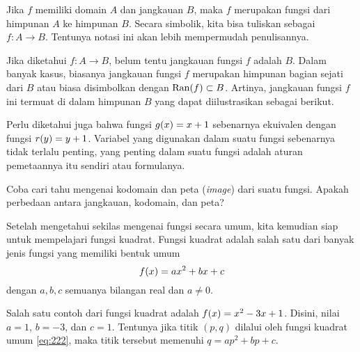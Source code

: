 \par Jika $ f $ memiliki domain $ A $ dan jangkauan $ B $, maka $ f $ merupakan fungsi dari himpunan $ A $ ke himpunan $ B $. Secara simbolik, kita bisa tuliskan sebagai $ f \colon A \to B $. Tentunya notasi ini akan lebih mempermudah penulisannya.

\begin{warningbox}
	Jika diketahui $ f \colon A \to B $, belum tentu jangkauan fungsi $ f $ adalah $ B $. Dalam banyak kasus, biasanya jangkauan fungsi $ f $ merupakan himpunan bagian sejati dari $ B $ atau biasa disimbolkan dengan $ \mathop{}\!{\operatorname{Ran}}{\left({f}\right)} \subset B $. Artinya, jangkauan fungsi $ f $ ini termuat di dalam himpunan $ B $ yang dapat diilustrasikan sebagai berikut.
	\begin{center}
	\end{center}
\end{warningbox}

\par Perlu diketahui juga bahwa fungsi $ \mathop{}\!{g}{\left({x}\right)} = x + 1 $ sebenarnya ekuivalen dengan fungsi $ \mathop{}\!{r}{\left({y}\right)} = y + 1 $. Variabel yang digunakan dalam suatu fungsi sebenarnya tidak terlalu penting, yang penting dalam suatu fungsi adalah aturan pemetaannya itu sendiri atau formulanya.

\begin{explbox}
	Coba cari tahu mengenai kodomain dan peta (\textit{image}) dari suatu fungsi. Apakah perbedaan antara jangkauan, kodomain, dan peta?
\end{explbox}

\par Setelah mengetahui sekilas mengenai fungsi secara umum, kita kemudian siap untuk mempelajari fungsi kuadrat. Fungsi kuadrat adalah salah satu dari banyak jenis fungsi yang memiliki bentuk umum
\begin{equation} \label{eq:222}
	\mathop{}\!{f}{\left({x}\right)} = ax^{2} + bx + c
\end{equation}
dengan $ a, b, c $ semuanya bilangan real dan $ a \ne 0 $.

\par Salah satu contoh dari fungsi kuadrat adalah $ \mathop{}\!{f}{\left({x}\right)} = x^{2} - 3x + 1 $. Disini, nilai $ a = 1 $, $ b = -3 $, dan $ c = 1 $. Tentunya jika titik $ \left(p, q\right) $ dilalui oleh fungsi kuadrat umum \ref{eq:222}, maka titik tersebut memenuhi $ q = ap^{2} + bp + c $.


